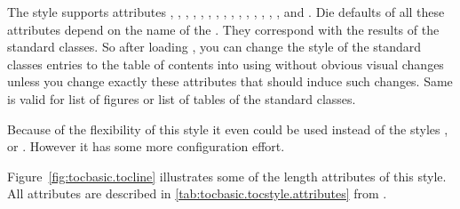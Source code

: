 \begin{description}
  The style supports attributes , ,
  , , ,
  , , ,
  , , ,
  , ,
  , , and
  . Die defaults of all these attributes depend on
  the name of the . They correspond with the results of the
  standard classes. So after loading , you can change the
  style of the standard classes entries to the table of contents into
   using  without obvious visual
  changes unless you change exactly these attributes that should induce such
  changes. Same is valid for list of figures or list of tables of the standard
  classes.

  Because of the flexibility of this style it even could be used instead of
  the styles ,  or
  . However it has some more configuration effort.

  {Figure~\ref*{fig:tocbasic.tocline}} illustrates some of the length
  attributes of this style. All attributes are described in
  \autoref{tab:tocbasic.tocstyle.attributes} from
  .
  \begin{figure}
    \centering
\end{figure}
\end{description}
